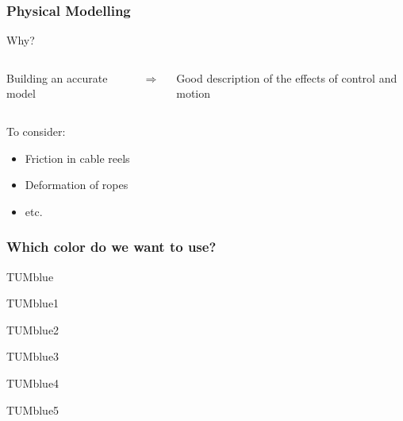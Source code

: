 \begin{frame}[c]
	\frametitle{Physical Modelling}
		Why?
		\begin{columns}
				\centering
				\begin{tcolorbox}[width=\linewidth,colback={TUMblue}]
					Building an accurate model
				\end{tcolorbox}
				\centering
				\Huge{$\Rightarrow$}
				\centering
				\begin{tcolorbox}[width=\linewidth,colback={TUMblue1}]
					Good description of the effects of control and motion
				\end{tcolorbox}
		\end{columns}
	\vspace{0.5cm}
		To consider:
		\begin{itemize}
			\item{Friction in cable reels}
			\item{Deformation of ropes}
			\item{etc.}
		\end{itemize}
\end{frame}

\begin{frame}
	\frametitle{Which color do we want to use?}
	\begin{tcolorbox}[width=\linewidth,colback={TUMblue}]
		TUMblue
	\end{tcolorbox}
	\begin{tcolorbox}[width=\linewidth,colback={TUMblue1}]
		TUMblue1
	\end{tcolorbox}
	\begin{tcolorbox}[width=\linewidth,colback={TUMblue2}]
		TUMblue2
	\end{tcolorbox}
	\begin{tcolorbox}[width=\linewidth,colback={TUMblue3}]
		TUMblue3
	\end{tcolorbox}
	\begin{tcolorbox}[width=\linewidth,colback={TUMblue4}]
		TUMblue4
	\end{tcolorbox}
	\begin{tcolorbox}[width=\linewidth,colback={TUMblue5}]
		TUMblue5
	\end{tcolorbox}
\end{frame}

